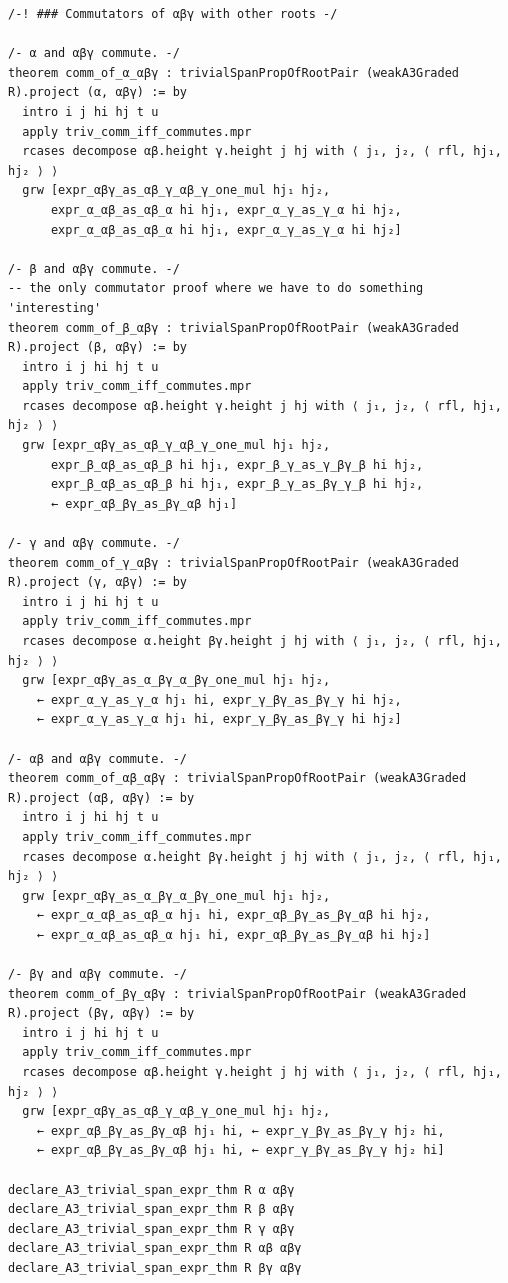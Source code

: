 \documentclass[10pt,a4paper]{article}
\begin{document}
\begin{Verbatim}
/-! ### Commutators of αβγ with other roots -/

/- α and αβγ commute. -/
theorem comm_of_α_αβγ : trivialSpanPropOfRootPair (weakA3Graded R).project (α, αβγ) := by
  intro i j hi hj t u
  apply triv_comm_iff_commutes.mpr
  rcases decompose αβ.height γ.height j hj with ⟨ j₁, j₂, ⟨ rfl, hj₁, hj₂ ⟩ ⟩
  grw [expr_αβγ_as_αβ_γ_αβ_γ_one_mul hj₁ hj₂,
      expr_α_αβ_as_αβ_α hi hj₁, expr_α_γ_as_γ_α hi hj₂,
      expr_α_αβ_as_αβ_α hi hj₁, expr_α_γ_as_γ_α hi hj₂]

/- β and αβγ commute. -/
-- the only commutator proof where we have to do something 'interesting'
theorem comm_of_β_αβγ : trivialSpanPropOfRootPair (weakA3Graded R).project (β, αβγ) := by
  intro i j hi hj t u
  apply triv_comm_iff_commutes.mpr
  rcases decompose αβ.height γ.height j hj with ⟨ j₁, j₂, ⟨ rfl, hj₁, hj₂ ⟩ ⟩
  grw [expr_αβγ_as_αβ_γ_αβ_γ_one_mul hj₁ hj₂,
      expr_β_αβ_as_αβ_β hi hj₁, expr_β_γ_as_γ_βγ_β hi hj₂,
      expr_β_αβ_as_αβ_β hi hj₁, expr_β_γ_as_βγ_γ_β hi hj₂,
      ← expr_αβ_βγ_as_βγ_αβ hj₁]

/- γ and αβγ commute. -/
theorem comm_of_γ_αβγ : trivialSpanPropOfRootPair (weakA3Graded R).project (γ, αβγ) := by
  intro i j hi hj t u
  apply triv_comm_iff_commutes.mpr
  rcases decompose α.height βγ.height j hj with ⟨ j₁, j₂, ⟨ rfl, hj₁, hj₂ ⟩ ⟩
  grw [expr_αβγ_as_α_βγ_α_βγ_one_mul hj₁ hj₂,
    ← expr_α_γ_as_γ_α hj₁ hi, expr_γ_βγ_as_βγ_γ hi hj₂,
    ← expr_α_γ_as_γ_α hj₁ hi, expr_γ_βγ_as_βγ_γ hi hj₂]

/- αβ and αβγ commute. -/
theorem comm_of_αβ_αβγ : trivialSpanPropOfRootPair (weakA3Graded R).project (αβ, αβγ) := by
  intro i j hi hj t u
  apply triv_comm_iff_commutes.mpr
  rcases decompose α.height βγ.height j hj with ⟨ j₁, j₂, ⟨ rfl, hj₁, hj₂ ⟩ ⟩
  grw [expr_αβγ_as_α_βγ_α_βγ_one_mul hj₁ hj₂,
    ← expr_α_αβ_as_αβ_α hj₁ hi, expr_αβ_βγ_as_βγ_αβ hi hj₂,
    ← expr_α_αβ_as_αβ_α hj₁ hi, expr_αβ_βγ_as_βγ_αβ hi hj₂]

/- βγ and αβγ commute. -/
theorem comm_of_βγ_αβγ : trivialSpanPropOfRootPair (weakA3Graded R).project (βγ, αβγ) := by
  intro i j hi hj t u
  apply triv_comm_iff_commutes.mpr
  rcases decompose αβ.height γ.height j hj with ⟨ j₁, j₂, ⟨ rfl, hj₁, hj₂ ⟩ ⟩
  grw [expr_αβγ_as_αβ_γ_αβ_γ_one_mul hj₁ hj₂,
    ← expr_αβ_βγ_as_βγ_αβ hj₁ hi, ← expr_γ_βγ_as_βγ_γ hj₂ hi,
    ← expr_αβ_βγ_as_βγ_αβ hj₁ hi, ← expr_γ_βγ_as_βγ_γ hj₂ hi]

declare_A3_trivial_span_expr_thm R α αβγ
declare_A3_trivial_span_expr_thm R β αβγ
declare_A3_trivial_span_expr_thm R γ αβγ
declare_A3_trivial_span_expr_thm R αβ αβγ
declare_A3_trivial_span_expr_thm R βγ αβγ


\end{Verbatim}
\end{document}
